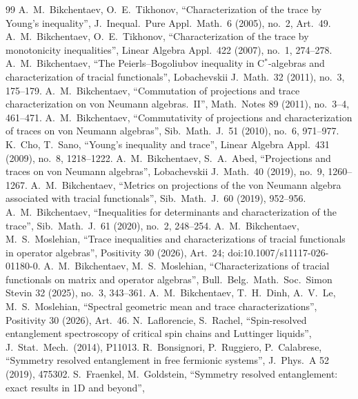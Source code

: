 \documentclass[11pt]{article}
\begin{document}
{\begin{thebibliography}{99}
 A.~M.~Bikchentaev, O.~E.~Tikhonov, ``Characterization of the trace by Young's
  inequality'', J.\ Inequal.\ Pure Appl.\ Math.\ 6 (2005), no.~2, Art.~49.
 A.~M.~Bikchentaev, O.~E.~Tikhonov, ``Characterization of the trace by monotonicity
  inequalities'', Linear Algebra Appl.\ 422 (2007), no.~1, 274--278.
 A.~M.~Bikchentaev, ``The Peierls--Bogoliubov inequality in C$^*$-algebras and
  characterization of tracial functionals'', Lobachevskii J.\ Math.\ 32 (2011), no.~3, 175--179.
 A.~M.~Bikchentaev, ``Commutation of projections and trace characterization on von
  Neumann algebras.~II'', Math.\ Notes 89 (2011), no.~3--4, 461--471.
 A.~M.~Bikchentaev, ``Commutativity of projections and characterization of traces on von
  Neumann algebras'', Sib.\ Math.\ J.\ 51 (2010), no.~6, 971--977.
 K.~Cho, T.~Sano, ``Young's inequality and trace'', Linear Algebra Appl.\ 431 (2009), no.~8,
  1218--1222.
 A.~M.~Bikchentaev, S.~A.~Abed, ``Projections and traces on von Neumann algebras'',
  Lobachevskii J.\ Math.\ 40 (2019), no.~9, 1260--1267.
 A.~M.~Bikchentaev, ``Metrics on projections of the von Neumann algebra associated
  with tracial functionals'', Sib.\ Math.\ J.\ 60 (2019), 952--956.
 A.~M.~Bikchentaev, ``Inequalities for determinants and characterization of the
  trace'', Sib.\ Math.\ J.\ 61 (2020), no.~2, 248--254.
 A.~M.~Bikchentaev, M.~S.~Moslehian, ``Trace inequalities and characterizations
  of tracial functionals in operator algebras'', Positivity 30 (2026), Art.~24; doi:10.1007/s11117-026-01180-0.
 A.~M.~Bikchentaev, M.~S.~Moslehian, ``Characterizations of tracial functionals on
  matrix and operator algebras'', Bull.\ Belg.\ Math.\ Soc.\ Simon Stevin 32 (2025), no.~3, 343--361.
 A.~M.~Bikchentaev, T.~H.~Dinh, A.~V.~Le, M.~S.~Moslehian, ``Spectral geometric mean
  and trace characterizations'', Positivity 30 (2026), Art.~46.
 N.~Laflorencie, S.~Rachel, ``Spin-resolved entanglement spectroscopy of critical spin
  chains and Luttinger liquids'', J.\ Stat.\ Mech.\ (2014), P11013.
 R.~Bonsignori, P.~Ruggiero, P.~Calabrese, ``Symmetry resolved entanglement in free fermionic
  systems'', J.\ Phys.\ A 52 (2019), 475302.
 S.~Fraenkel, M.~Goldstein, ``Symmetry resolved entanglement: exact results in 1D and beyond'',

\end{thebibliography}}
\end{document}
